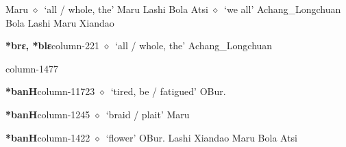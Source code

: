 \hspace{1ex}
         Maru 
\hspace{1ex}
         $\diamond$~`all / whole, the'
         Maru 
\hspace{1ex}
         Lashi 
\hspace{1ex}
         Bola 
\hspace{1ex}
         Atsi 
\hspace{1ex}
         $\diamond$~`we all'
         Achang\_Longchuan 
\hspace{1ex}
         Bola 
\hspace{1ex}
         Lashi 
\hspace{1ex}
         Maru 
\hspace{1ex}
         Xiandao 
  \item {\footnotesize \textbf{*brɛ, *blɛ}}{\tiny column-221}
         $\diamond$~`all / whole, the'
         Achang\_Longchuan 
  \item {\footnotesize \textbf{}}{\tiny column-1477}
  \item {\footnotesize \textbf{*banH}}{\tiny column-11723}
         $\diamond$~`tired, be / fatigued'
         OBur. 
  \item {\footnotesize \textbf{*banH}}{\tiny column-1245}
         $\diamond$~`braid / plait'
         Maru 
  \item {\footnotesize \textbf{*banH}}{\tiny column-1422}
         $\diamond$~`flower'
         OBur. 
\hspace{1ex}
         Lashi 
\hspace{1ex}
         Xiandao 
\hspace{1ex}
         Maru 
\hspace{1ex}
         Bola 
\hspace{1ex}
         Atsi 
